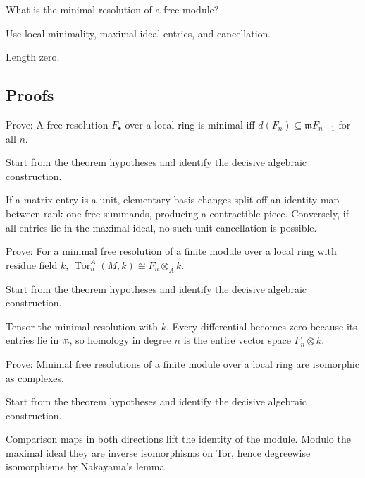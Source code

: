 \begin{exercise}\label{exr:v25-expand-05}
What is the minimal resolution of a free module?
\end{exercise}
\begin{hint}
Use local minimality, maximal-ideal entries, and cancellation.
\end{hint}
\begin{solution}
Length zero.
\end{solution}

\subsection*{Proofs}

\begin{exercise}\label{exr:v25-expand-06}
Prove: A free resolution $F_\bullet$ over a local ring is minimal iff $d(F_n)\subseteq\mathfrak mF_{n-1}$ for all $n$.
\end{exercise}
\begin{hint}
Start from the theorem hypotheses and identify the decisive algebraic construction.
\end{hint}
\begin{solution}
If a matrix entry is a unit, elementary basis changes split off an identity map between rank-one free summands, producing a contractible piece. Conversely, if all entries lie in the maximal ideal, no such unit cancellation is possible.
\end{solution}

\begin{exercise}\label{exr:v25-expand-07}
Prove: For a minimal free resolution of a finite module over a local ring with residue field $k$, $\operatorname{Tor}_n^A(M,k)\cong F_n\otimes_A k$.
\end{exercise}
\begin{hint}
Start from the theorem hypotheses and identify the decisive algebraic construction.
\end{hint}
\begin{solution}
Tensor the minimal resolution with $k$. Every differential becomes zero because its entries lie in $\mathfrak m$, so homology in degree $n$ is the entire vector space $F_n\otimes k$.
\end{solution}

\begin{exercise}\label{exr:v25-expand-08}
Prove: Minimal free resolutions of a finite module over a local ring are isomorphic as complexes.
\end{exercise}
\begin{hint}
Start from the theorem hypotheses and identify the decisive algebraic construction.
\end{hint}
\begin{solution}
Comparison maps in both directions lift the identity of the module. Modulo the maximal ideal they are inverse isomorphisms on Tor, hence degreewise isomorphisms by Nakayama's lemma.
\end{solution}


